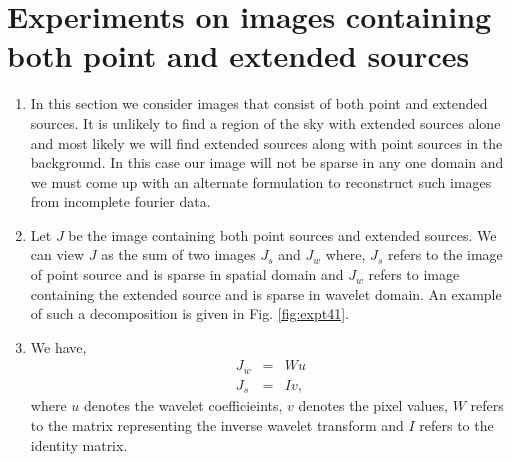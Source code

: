 \section{Experiments on images containing both point and extended sources}
\begin{enumerate}
\item In this section we consider images that consist of both point and extended sources. It is unlikely to find a region of the sky with extended sources alone and most likely we will find extended sources along with point sources in the background. In this case our image will not be sparse in any one domain and we must come up with an alternate formulation to reconstruct such images from incomplete fourier data.
\item Let $J$ be the image containing both point sources and extended sources. We can view $J$ as the sum of two images $J_s$ and $J_w$ where, $J_s$ refers to the image of point source and is sparse in spatial domain and $J_w$ refers to image containing the extended source and is sparse in wavelet domain. An example of such a decomposition is given in Fig. \ref{fig:expt41}.
\item We have,
\begin{eqnarray}
J_w &=& W u \\
J_s &=& I v,
\end{eqnarray}
where  $u$ denotes the wavelet coefficieints, $v$ denotes the pixel values, $W$ refers to the matrix representing the inverse wavelet transform and $I$ refers to the identity matrix.
\begin{figure}[b!]
\hspace{0.4in}
\hspace{0.1in}
\end{figure}
\end{enumerate}
